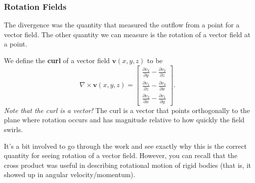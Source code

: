         \subsubsection{Rotation Fields}
        The divergence was the quantity that measured the outflow from a point for a vector field.  The other quantity we can measure is the rotation of a vector field at a point.
        
        We define the \textbf{curl} of a vector field $\mathbf{v}(x,y,z)$ to be
        \[
        \nabla \times \mathbf{v}(x,y,z) = \begin{bmatrix} \frac{\partial v_3}{\partial y} - \frac{\partial v_2}{\partial z} \\ \frac{\partial v_1}{\partial z} - \frac{\partial v_3}{\partial x} \\ \frac{\partial v_2}{\partial x} - \frac{\partial v_1}{\partial y} \end{bmatrix}.
        \]
        \emph{Note that the curl is a vector!} The curl is a vector that points orthogonally to the plane where rotation occurs and has magnitude relative to how quickly the field swirls.
        
        It's a bit involved to go through the work and see exactly why this is the correct quantity for seeing rotation of a vector field.  However, you can recall that the cross product was useful in describing rotational motion of rigid bodies (that is, it showed up in angular velocity/momentum).
        
